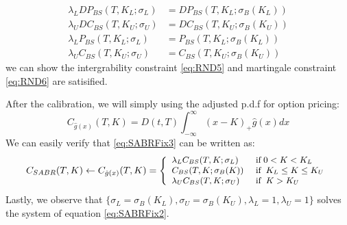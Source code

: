 \documentclass[letterpaper,12pt,titlepage,oneside,final]{book}
\numberwithin{equation}{section}
\theoremstyle{definition}
\begin{document}
\begin{equation}
	\begin{split}
		\lambda_L DP_{BS}(T,K_{L};\sigma_L)&=DP_{BS}(T,K_{L};\sigma_{B}(K_{L}))\\
		\lambda_U DC_{BS}(T,K_{U};\sigma_U)&=DC_{BS}(T,K_{U};\sigma_{B}(K_{U}))\\
		\lambda_L P_{BS}(T,K_{L};\sigma_L)&=P_{BS}(T,K_{L};\sigma_{B}(K_{L}))\\
		\lambda_U C_{BS}(T,K_{U};\sigma_U)&=C_{BS}(T,K_{U};\sigma_{B}(K_{U}))
	\end{split}
	\label{eq:SABRFix2}
\end{equation}
we can  show the  intergrability constraint \eqref{eq:RND5} and martingale  constraint \eqref{eq:RND6} are satisified. 






 After the calibration, we will simply using the adjusted p.d.f for option pricing:
\begin{equation}
	C_{\hat{g}(x)}(T,K)=D(t,T)\int_{-\infty}^{\infty} (x-K)_+ \hat{g}(x) dx
	\label{eq:SABRFix3}
\end{equation}
We can easily verify that \eqref{eq:SABRFix3} can be written as:
\[\small
	C_{SABR}(T,K) \leftarrow C_{\hat{g}(x)}(T,K)=\left\{ \begin{array}{ll }
		\lambda_L C_{BS}(T,K;\sigma_L)\;&  \text{if} \; 0<K< K_{L}\\

		C_{BS}(T,K;\sigma_B(K))\;&  \text{if} \; \;  K_{L} \leq K \leq K_{U}\\

		\lambda_U C_{BS}(T,K;\sigma_U) \; &  \text{if} \; \;  K> K_{U}
\end{array} \right.
\]
Lastly, we observe that $\{\sigma_{L}=\sigma_{B}(K_L),\sigma_{U}=\sigma_{B}(K_U), \lambda_{L}=1, \lambda_{U}=1\}$ solves the  system of equation  \eqref{eq:SABRFix2}. 
\end{document}
